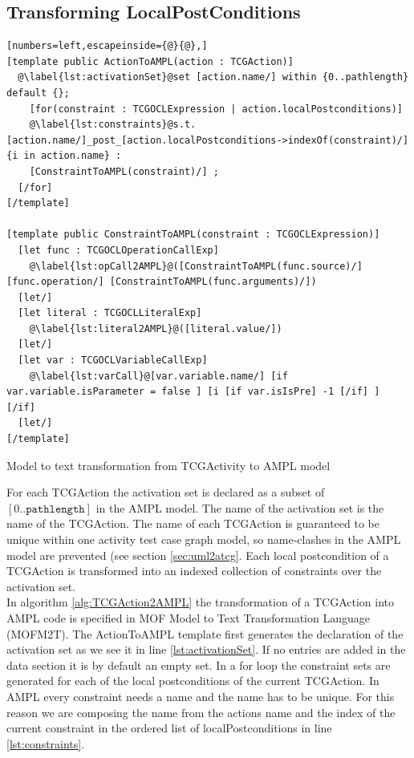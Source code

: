\subsection{Transforming LocalPostConditions}
\label{sec:Postconditions2AMPL}
\begin{algorithm}
\begin{lstlisting}[numbers=left,escapeinside={@}{@},]
[template public ActionToAMPL(action : TCGAction)]
  @\label{lst:activationSet}@set [action.name/] within {0..pathlength} default {};
    [for(constraint : TCGOCLExpression | action.localPostconditions)]
    @\label{lst:constraints}@s.t. [action.name/]_post_[action.localPostconditions->indexOf(constraint)/] {i in action.name} : 
    [ConstraintToAMPL(constraint)/] ;
  [/for]
[/template]

[template public ConstraintToAMPL(constraint : TCGOCLExpression)]
  [let func : TCGOCLOperationCallExp]
    @\label{lst:opCall2AMPL}@([ConstraintToAMPL(func.source)/] [func.operation/] [ConstraintToAMPL(func.arguments)/])
  [let/]
  [let literal : TCGOCLLiteralExp]
    @\label{lst:literal2AMPL}@([literal.value/])
  [let/]
  [let var : TCGOCLVariableCallExp]
    @\label{lst:varCall}@[var.variable.name/] [if var.variable.isParameter = false ] [i [if var.isIsPre] -1 [/if] ] [/if]
  [let/]
[/template]
\end{lstlisting}
\caption{Model to text transformation from TCGActivity to AMPL model}
\label{alg:TCGAction2AMPL}
\end{algorithm}
For each TCGAction the activation set is declared as a subset of $\left[0..\texttt{pathlength}\right]$ in the AMPL model. The name of the activation set is the name of the TCGAction. The name of each TCGAction is guaranteed to be unique within one activity test case graph model, so name-clashes in the AMPL model are prevented (see section \ref{sec:uml2atcg}. Each local postcondition of a TCGAction is transformed into an indexed collection of constraints over the activation set.\\
In algorithm \ref{alg:TCGAction2AMPL} the transformation of a TCGAction into AMPL code is specified in MOF Model to Text Transformation Language (MOFM2T). The ActionToAMPL template first generates the declaration of the activation set as we see it in line \ref{lst:activationSet}. If no entries are added in the data section it is by default an empty set. In a for loop the constraint sets are generated for each of the local postconditions of the current TCGAction. In AMPL every constraint needs a name and the name has to be unique. For this reason we are composing the name from the actions name and the index of the current constraint in the ordered list of localPostconditions in line \ref{lst:constraints}.\\
